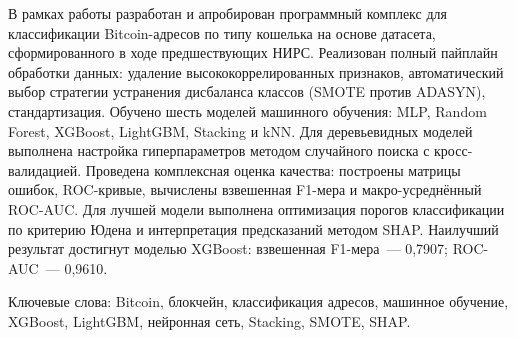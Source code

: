 \abstract %
В рамках работы разработан и апробирован программный комплекс для классификации Bitcoin-адресов по типу кошелька на основе датасета, сформированного в ходе предшествующих НИРС. Реализован полный пайплайн обработки данных: удаление высококоррелированных признаков, автоматический выбор стратегии устранения дисбаланса классов (SMOTE против ADASYN), стандартизация. Обучено шесть моделей машинного обучения: MLP, Random Forest, XGBoost, LightGBM, Stacking и kNN. Для деревьевидных моделей выполнена настройка гиперпараметров методом случайного поиска с кросс-валидацией. Проведена комплексная оценка качества: построены матрицы ошибок, ROC-кривые, вычислены взвешенная F1-мера и макро-усреднённый ROC-AUC. Для лучшей модели выполнена оптимизация порогов классификации по критерию Юдена и интерпретация предсказаний методом SHAP. Наилучший результат достигнут моделью XGBoost: взвешенная F1-мера~--- 0,7907; ROC-AUC~--- 0,9610.

Ключевые слова: Bitcoin, блокчейн, классификация адресов, машинное обучение, XGBoost, LightGBM, нейронная сеть, Stacking, SMOTE, SHAP.
